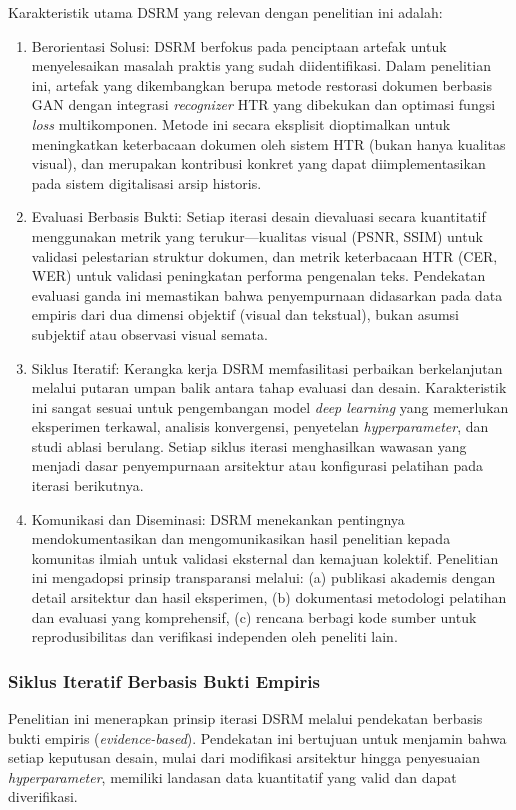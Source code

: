 \documentclass[12pt,a4paper]{article}
\begin{document}
Karakteristik utama DSRM yang relevan dengan penelitian ini adalah:

\begin{enumerate}[label=\arabic*., leftmargin=*, nosep]
    \item Berorientasi Solusi: DSRM berfokus pada penciptaan artefak untuk menyelesaikan masalah praktis yang sudah diidentifikasi. Dalam penelitian ini, artefak yang dikembangkan berupa metode restorasi dokumen berbasis GAN dengan integrasi \textit{recognizer} HTR yang dibekukan dan optimasi fungsi \textit{loss} multikomponen. Metode ini secara eksplisit dioptimalkan untuk meningkatkan keterbacaan dokumen oleh sistem HTR (bukan hanya kualitas visual), dan merupakan kontribusi konkret yang dapat diimplementasikan pada sistem digitalisasi arsip historis.

    \item Evaluasi Berbasis Bukti: Setiap iterasi desain dievaluasi secara kuantitatif menggunakan metrik yang terukur---kualitas visual (PSNR, SSIM) untuk validasi pelestarian struktur dokumen, dan metrik keterbacaan HTR (CER, WER) untuk validasi peningkatan performa pengenalan teks. Pendekatan evaluasi ganda ini memastikan bahwa penyempurnaan didasarkan pada data empiris dari dua dimensi objektif (visual dan tekstual), bukan asumsi subjektif atau observasi visual semata.

    \item Siklus Iteratif: Kerangka kerja DSRM memfasilitasi perbaikan berkelanjutan melalui putaran umpan balik antara tahap evaluasi dan desain. Karakteristik ini sangat sesuai untuk pengembangan model \textit{deep learning} yang memerlukan eksperimen terkawal, analisis konvergensi, penyetelan \textit{hyperparameter}, dan studi ablasi berulang. Setiap siklus iterasi menghasilkan wawasan yang menjadi dasar penyempurnaan arsitektur atau konfigurasi pelatihan pada iterasi berikutnya.

    \item Komunikasi dan Diseminasi: DSRM menekankan pentingnya mendokumentasikan dan mengomunikasikan hasil penelitian kepada komunitas ilmiah untuk validasi eksternal dan kemajuan kolektif. Penelitian ini mengadopsi prinsip transparansi melalui: (a) publikasi akademis dengan detail arsitektur dan hasil eksperimen, (b) dokumentasi metodologi pelatihan dan evaluasi yang komprehensif, (c) rencana berbagi kode sumber untuk reprodusibilitas dan verifikasi independen oleh peneliti lain.
\end{enumerate}

\subsubsection{Siklus Iteratif Berbasis Bukti Empiris}
Penelitian ini menerapkan prinsip iterasi DSRM melalui pendekatan berbasis bukti empiris (\textit{evidence-based}). Pendekatan ini bertujuan untuk menjamin bahwa setiap keputusan desain, mulai dari modifikasi arsitektur hingga penyesuaian \textit{hyperparameter}, memiliki landasan data kuantitatif yang valid dan dapat diverifikasi.
\end{document}
